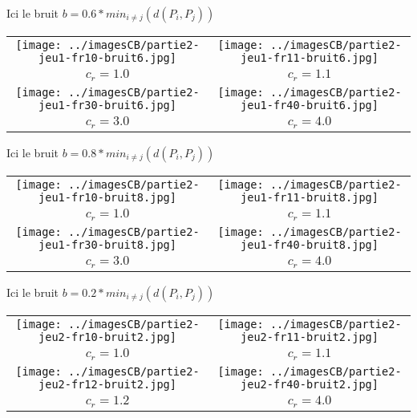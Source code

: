 \documentclass[11pt,a4paper]{article}
\begin{document}
Ici le bruit $b=0.6*min_{i \neq j}(d(P_i,P_j))$
\begin{center}
\begin{tabular}{|c|c|}
\hline
\texttt{[image: ../imagesCB/partie2-jeu1-fr10-bruit6.jpg]} & \texttt{[image: ../imagesCB/partie2-jeu1-fr11-bruit6.jpg]} \\
$c_r=1.0$                                                             & $c_r=1.1$ \\
\hline
\texttt{[image: ../imagesCB/partie2-jeu1-fr30-bruit6.jpg]} & \texttt{[image: ../imagesCB/partie2-jeu1-fr40-bruit6.jpg]} \\
$c_r=3.0$                                                             & $c_r=4.0$ \\
\hline
\end{tabular}
\end{center}

\pagebreak

Ici le bruit $b=0.8*min_{i \neq j}(d(P_i,P_j))$
\begin{center}
\begin{tabular}{|c|c|}
\hline
\texttt{[image: ../imagesCB/partie2-jeu1-fr10-bruit8.jpg]} & \texttt{[image: ../imagesCB/partie2-jeu1-fr11-bruit8.jpg]} \\
$c_r=1.0$                                                             & $c_r=1.1$ \\
\hline
\texttt{[image: ../imagesCB/partie2-jeu1-fr30-bruit8.jpg]} & \texttt{[image: ../imagesCB/partie2-jeu1-fr40-bruit8.jpg]} \\
$c_r=3.0$                                                             & $c_r=4.0$ \\
\hline
\end{tabular}
\end{center}

\pagebreak

Ici le bruit $b=0.2*min_{i \neq j}(d(P_i,P_j))$
\begin{center}
\begin{tabular}{|c|c|}
\hline
\texttt{[image: ../imagesCB/partie2-jeu2-fr10-bruit2.jpg]} & \texttt{[image: ../imagesCB/partie2-jeu2-fr11-bruit2.jpg]} \\
$c_r=1.0$                                                             & $c_r=1.1$ \\
\hline
\texttt{[image: ../imagesCB/partie2-jeu2-fr12-bruit2.jpg]} & \texttt{[image: ../imagesCB/partie2-jeu2-fr40-bruit2.jpg]} \\
$c_r=1.2$                                                             & $c_r=4.0$ \\
\hline
\end{tabular}
\end{center}
\end{document}
